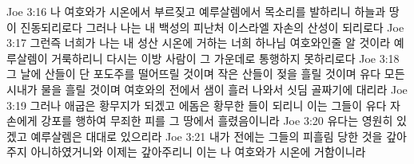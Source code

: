 Joe 3:16  나 여호와가 시온에서 부르짖고 예루살렘에서 목소리를 발하리니 하늘과 땅이 진동되리로다 그러나 나는 내 백성의 피난처 이스라엘 자손의 산성이 되리로다
Joe 3:17  그런즉 너희가 나는 내 성산 시온에 거하는 너희 하나님 여호와인줄 알 것이라 예루살렘이 거룩하리니 다시는 이방 사람이 그 가운데로 통행하지 못하리로다
Joe 3:18  그 날에 산들이 단 포도주를 떨어뜨릴 것이며 작은 산들이 젖을 흘릴 것이며 유다 모든 시내가 물을 흘릴 것이며 여호와의 전에서 샘이 흘러 나와서 싯딤 골짜기에 대리라
Joe 3:19  그러나 애굽은 황무지가 되겠고 에돔은 황무한 들이 되리니 이는 그들이 유다 자손에게 강포를 행하여 무죄한 피를 그 땅에서 흘렸음이니라
Joe 3:20  유다는 영원히 있겠고 예루살렘은 대대로 있으리라
Joe 3:21  내가 전에는 그들의 피흘림 당한 것을 갚아주지 아니하였거니와 이제는 갚아주리니 이는 나 여호와가 시온에 거함이니라


